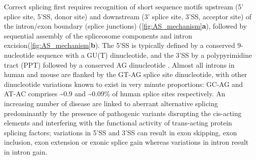 Correct splicing first requires recognition of short sequence motifs upstream (5' splice site, 5'SS, donor site) and downstream (3' splice site, 3'SS, acceptor site) of the intron/exon boundary (splice junctions) (\cref{fig:AS_mechanism}\textbf{a}),  followed by sequential assembly of the spliceosome components and intron excision\cite{Herzel2017}(\cref{fig:AS_mechanism}\textbf{b}). The 5'SS is typically defined by a conserved 9-nucleotide sequence with a GU(T) dinucleotide, and the 3'SS by a polypyrimidine tract (PPT) followed by a conserved AG dinucleotide \cite{Will2011}. Almost all introns in human and mouse are flanked by the GT-AG splice site dinucleotide\cite{Sheth2006}, with other dinucleotide variations known to exist in very minute proportions: GC-AG and AT-AC comprises \textasciitilde0.9 and \textasciitilde0.09\% of human splice sites respectively\cite{Parada2014}. An increasing number of disease are linked to aberrant alternative splicing predominantly by the presence of pathogenic variants disrupting the cis-acting elements and interfering with the functional activity of trans-acting protein splicing factors; variations in 5'SS and 3'SS can result in exon skipping, exon inclusion, exon extension or exonic splice gain whereas variations in intron result in intron gain.

